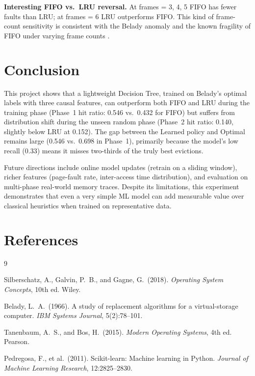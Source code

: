 \documentclass[12pt,a4paper]{article}
\begin{document}
\textbf{Interesting FIFO vs.\ LRU reversal.} At frames = 3, 4, 5 FIFO has
fewer faults than LRU; at frames = 6 LRU outperforms FIFO. This kind of
frame-count sensitivity is consistent with the Belady anomaly and the known
fragility of FIFO under varying frame counts \cite{tanenbaum2015}.

\section{Conclusion}

This project shows that a lightweight Decision Tree, trained on Belady's
optimal labels with three causal features, can outperform both FIFO and LRU
during the training phase (Phase~1 hit ratio: 0.546 vs.\ 0.432 for FIFO) but
suffers from distribution shift during the unseen random phase (Phase~2 hit
ratio: 0.140, slightly below LRU at 0.152). The gap between the Learned policy
and Optimal remains large (0.546 vs.\ 0.698 in Phase~1), primarily because the
model's low recall (0.33) means it misses two-thirds of the truly best evictions.

Future directions include online model updates (retrain on a sliding window),
richer features (page-fault rate, inter-access time distribution), and
evaluation on multi-phase real-world memory traces. Despite its limitations,
this experiment demonstrates that even a very simple ML model can add
measurable value over classical heuristics when trained on representative data.

\section*{References}
\begingroup
\renewcommand{\section}[2]{}%


\begin{thebibliography}{9}

Silberschatz, A., Galvin, P.~B., and Gagne, G.\ (2018).
\newblock \emph{Operating System Concepts}, 10th ed.
\newblock Wiley.

Belady, L.~A.\ (1966).
\newblock A study of replacement algorithms for a virtual-storage computer.
\newblock \emph{IBM Systems Journal}, 5(2):78--101.

Tanenbaum, A.~S., and Bos, H.\ (2015).
\newblock \emph{Modern Operating Systems}, 4th ed.
\newblock Pearson.

Pedregosa, F., et al.\ (2011).
\newblock Scikit-learn: Machine learning in Python.
\newblock \emph{Journal of Machine Learning Research}, 12:2825--2830.

\end{thebibliography}
\endgroup
\end{document}
